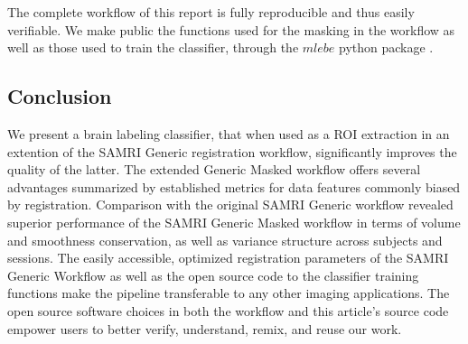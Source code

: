 The complete workflow of this report is fully reproducible and thus easily verifiable.
We make public the functions used for the masking in the workflow as well as those used to train the classifier, through the \textcolor{mg}{\texttt{$mlebe$}} python package \citep{mlebe}.

\subsection{Conclusion}

We present a brain labeling classifier, that when used as a ROI extraction in an extention of the SAMRI Generic
registration workflow, significantly improves the quality of the latter.
The extended Generic Masked workflow offers several advantages summarized by established metrics for data features commonly biased by registration.
Comparison with the original SAMRI Generic workflow revealed superior performance of the SAMRI Generic Masked workflow in terms of volume and smoothness conservation, as well as variance structure across subjects and sessions.
The easily accessible, optimized registration parameters of the SAMRI Generic Workflow as well as the open source code to the classifier training functions make the pipeline transferable to any other imaging applications.
The open source software choices in both the workflow and this article's source code empower users to better verify, understand, remix, and reuse our work.
